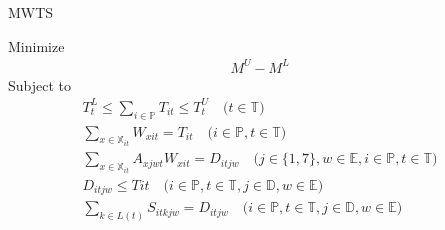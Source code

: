\documentclass{article}
\newcommand{\nipar}{\par\noindent\ignorespaces}
\begin{document}























\newpage
\nipar {\bf Model:} MWTS
\nipar
\nipar Minimize
\begin{gather}
M^{U} - M^{L} \label{eqn:obj} 
\end{gather}
Subject to
\begin{gather}
T^{L}_{t} \leq \sum_{i \in \mathbb{P}} T_{it} \leq T^{U}_{t} \quad \text{($t \in \mathbb{T}$)} \label{eqn:tt_ub} \\
%
\sum_{x \in \mathbb{X}_{it}}W_{xit} = T_{it} \quad \text{($i \in \mathbb{P}, t \in \mathbb{T}$)} \label{eqn:W_T_tot} \\
%
\sum_{x \in \mathbb{X}_{it}}A_{xjwt}W_{xit} = D_{itjw} \quad \text{($j \in \{1,7\},w \in \mathbb{E},i \in \mathbb{P}, t \in \mathbb{T}$)} \label{eqn:WW_DT} \\
%
D_{itjw} \leq T{it} \quad \text{($i \in \mathbb{P},t \in \mathbb{T},j \in \mathbb{D},w \in \mathbb{E}$)} \label{eqn:D_T_dailyub} \\
%
\sum_{k \in L(t)}S_{itkjw} = D_{itjw} \quad \text{($i \in \mathbb{P},t \in \mathbb{T},j \in \mathbb{D},w \in \mathbb{E}$)} \label{eqn:S_D_dailyeq} 
\end{gather} 
\end{document}
